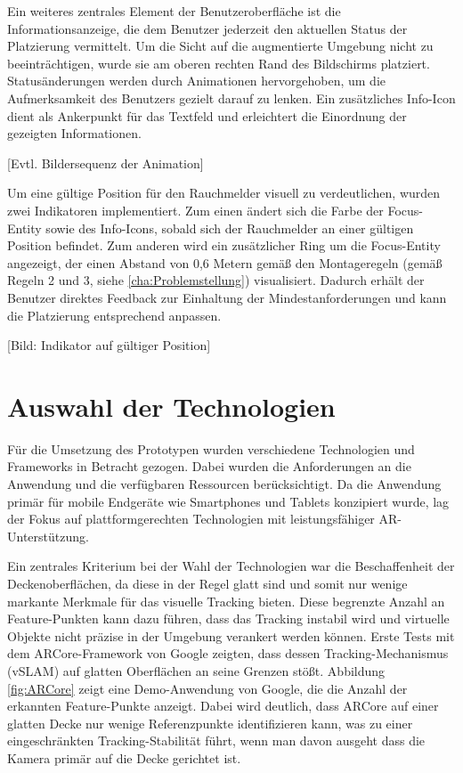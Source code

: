 Ein weiteres zentrales Element der Benutzeroberfläche ist die Informationsanzeige, die dem Benutzer jederzeit den aktuellen Status der Platzierung vermittelt. Um die Sicht auf die augmentierte Umgebung nicht zu beeinträchtigen, wurde sie am oberen rechten Rand des Bildschirms platziert. Statusänderungen werden durch Animationen hervorgehoben, um die Aufmerksamkeit des Benutzers gezielt darauf zu lenken. Ein zusätzliches Info-Icon dient als Ankerpunkt für das Textfeld und erleichtert die Einordnung der gezeigten Informationen.

[Evtl. Bildersequenz der Animation]

Um eine gültige Position für den Rauchmelder visuell zu verdeutlichen, wurden zwei Indikatoren implementiert. Zum einen ändert sich die Farbe der Focus-Entity sowie des Info-Icons, sobald sich der Rauchmelder an einer gültigen Position befindet. Zum anderen wird ein zusätzlicher Ring um die Focus-Entity angezeigt, der einen Abstand von 0,6 Metern gemäß den Montageregeln (gemäß Regeln 2 und 3, siehe \ref{cha:Problemstellung}) visualisiert. Dadurch erhält der Benutzer direktes Feedback zur Einhaltung der Mindestanforderungen und kann die Platzierung entsprechend anpassen.

[Bild: Indikator auf gültiger Position]

\section{Auswahl der Technologien}

Für die Umsetzung des Prototypen wurden verschiedene Technologien und Frameworks in Betracht gezogen. Dabei wurden die Anforderungen an die Anwendung und die verfügbaren Ressourcen berücksichtigt. Da die Anwendung primär für mobile Endgeräte wie Smartphones und Tablets konzipiert wurde, lag der Fokus auf plattformgerechten Technologien mit leistungsfähiger AR-Unterstützung.

Ein zentrales Kriterium bei der Wahl der Technologien war die Beschaffenheit der Deckenoberflächen, da diese in der Regel glatt sind und somit nur wenige markante Merkmale für das visuelle Tracking bieten. Diese begrenzte Anzahl an Feature-Punkten kann dazu führen, dass das Tracking instabil wird und virtuelle Objekte nicht präzise in der Umgebung verankert werden können. Erste Tests mit dem ARCore-Framework von Google zeigten, dass dessen Tracking-Mechanismus (vSLAM) auf glatten Oberflächen an seine Grenzen stößt. Abbildung \ref{fig:ARCore} zeigt eine Demo-Anwendung von Google, die die Anzahl der erkannten Feature-Punkte anzeigt. Dabei wird deutlich, dass ARCore auf einer glatten Decke nur wenige Referenzpunkte identifizieren kann, was zu einer eingeschränkten Tracking-Stabilität führt, wenn man davon ausgeht dass die Kamera primär auf die Decke gerichtet ist.

